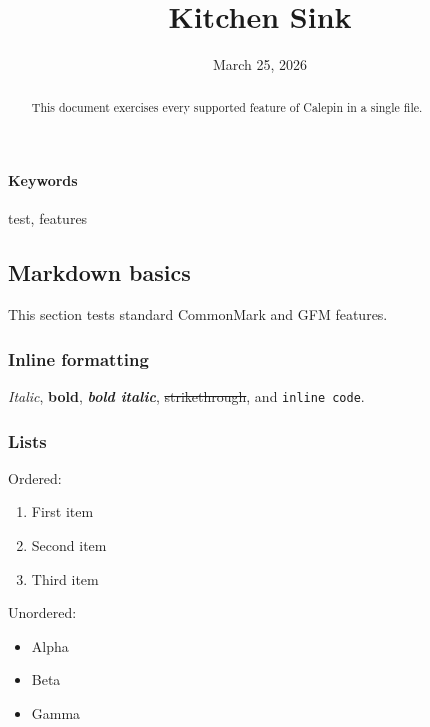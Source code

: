 \documentclass[11pt]{article}
\title{Kitchen Sink}
\author{ }
\date{March 25, 2026}
\begin{document}
\maketitle
\ifdefined\affiliationblock\affiliationblock\fi


\begin{abstract}
This document exercises every supported feature of Calepin in a single file.
\end{abstract}

\paragraph{ Keywords } test, features


\subsection{Markdown basics}
\label{sec-basics}

This section tests standard CommonMark and GFM features.

\subsubsection{Inline formatting}
\label{inline-formatting}

\emph{Italic}, \textbf{bold}, \emph{\textbf{bold italic}}, \sout{strikethrough}, and \texttt{inline code}.

\subsubsection{Lists}
\label{lists}

Ordered:

\begin{enumerate}
\item First item


\item Second item


\item Third item


\end{enumerate}

Unordered:

\begin{itemize}
\item Alpha


\item Beta


\item Gamma


\end{itemize}
\end{document}
